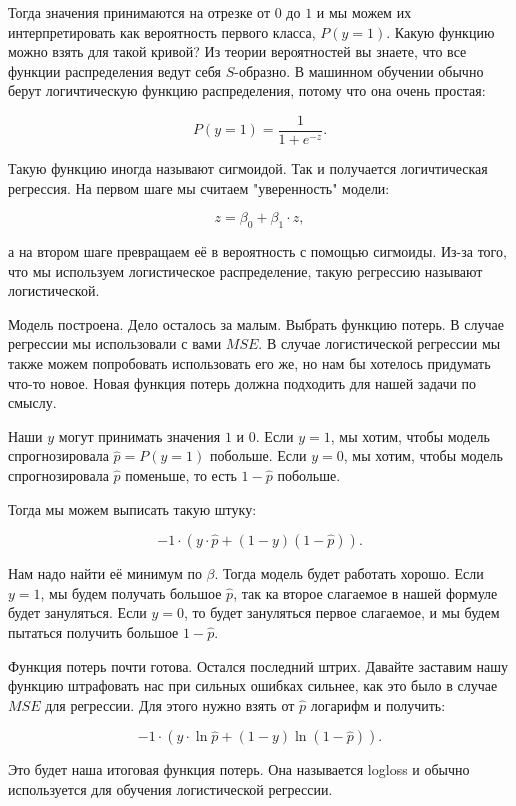 \documentclass[12pt, a4paper, oneside]{article}
\begin{document}
Тогда значения принимаются на отрезке от $0$ до $1$ и мы можем их интерпретировать как вероятность первого класса, $P(y = 1)$. Какую функцию можно взять для такой кривой? Из теории вероятностей вы знаете, что все функции распределения ведут себя $S$-образно.  В машинном обучении обычно берут логичтическую функцию распределения, потому что она очень простая: 

$$
P(y = 1) = \frac{1}{1 + e^{-z}}.
$$

Такую функцию иногда называют сигмоидой. Так и получается логичтическая регрессия. На первом шаге мы считаем "уверенность" модели: 

$$
z = \beta_0 + \beta_1 \cdot z,
$$

а на втором шаге превращаем её в вероятность с помощью сигмоиды.  Из-за того, что мы используем логистическое распределение, такую регрессию называют логистической.  

Модель построена. Дело осталось за малым. Выбрать функцию потерь. В случае регрессии мы использовали с вами $MSE$. В случае логистической регрессии мы также можем попробовать использовать его же, но нам бы хотелось придумать что-то новое. Новая функция потерь должна подходить для нашей задачи по смыслу.

Наши $y$ могут принимать значения $1$ и $0$. Если $y = 1$, мы хотим, чтобы модель спрогнозировала $\hat p = P(y= 1)$ побольше.  Если $y = 0$, мы хотим, чтобы модель спрогнозировала $\hat p$ поменьше, то есть $ 1 - \hat p$ побольше. 

Тогда мы можем выписать такую штуку: 

$$
-1 \cdot (y \cdot \hat p  + (1 - y) (1 - \hat p)).
$$

Нам надо найти её минимум по $\beta$. Тогда модель будет работать хорошо. Если $y = 1$, мы будем получать большое $\hat p$, так ка второе слагаемое в нашей формуле будет зануляться. Если $y = 0$, то будет зануляться первое слагаемое, и мы будем пытаться получить большое $1 - \hat p$. 

Функция потерь почти готова. Остался последний штрих.  Давайте заставим нашу функцию штрафовать нас при сильных ошибках сильнее, как это было в случае $MSE$ для регрессии. Для этого нужно взять от $\hat p$ логарифм и получить: 

$$
-1 \cdot (y \cdot \ln \hat p  + (1 - y)  \ln (1 - \hat p)).
$$

Это будет наша итоговая функция потерь. Она называется logloss и обычно используется для обучения логистической регрессии. 
\end{document}
